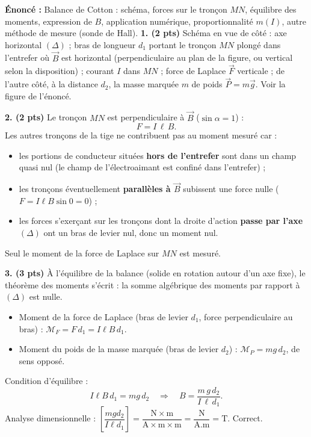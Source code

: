 \documentclass[11pt]{article}
\begin{document}
\begin{corrige}
\textbf{Énoncé :} Balance de Cotton : schéma, forces sur le tronçon $MN$, équilibre des moments, expression de $B$, application numérique, proportionnalité $m(I)$, autre méthode de mesure (sonde de Hall).
\tcblower
\textbf{1. (2 pts)} Schéma en vue de côté : axe horizontal $(\Delta)$ ; bras de longueur $d_1$ portant le tronçon $MN$ plongé dans l'entrefer où $\vec{B}$ est horizontal (perpendiculaire au plan de la figure, ou vertical selon la disposition) ; courant $I$ dans $MN$ ; force de Laplace $\vec{F}$ verticale ; de l'autre côté, à la distance $d_2$, la masse marquée $m$ de poids $\vec{P} = m\vec{g}$. Voir la figure de l'énoncé.

\textbf{2. (2 pts)} Le tronçon $MN$ est perpendiculaire à $\vec{B}$ ($\sin\alpha = 1$) :
\[ F = I\,\ell\,B. \]
Les autres tronçons de la tige ne contribuent pas au moment mesuré car :
\begin{itemize}
\item les portions de conducteur situées \textbf{hors de l'entrefer} sont dans un champ quasi nul (le champ de l'électroaimant est confiné dans l'entrefer) ;
\item les tronçons éventuellement \textbf{parallèles à $\vec{B}$} subissent une force nulle ($F = I\ell B\sin 0 = 0$) ;
\item les forces s'exerçant sur les tronçons dont la droite d'action \textbf{passe par l'axe $(\Delta)$} ont un bras de levier nul, donc un moment nul.
\end{itemize}
Seul le moment de la force de Laplace sur $MN$ est mesuré.

\textbf{3. (3 pts)} À l'équilibre de la balance (solide en rotation autour d'un axe fixe), le théorème des moments s'écrit : la somme algébrique des moments par rapport à $(\Delta)$ est nulle.
\begin{itemize}
\item Moment de la force de Laplace (bras de levier $d_1$, force perpendiculaire au bras) : $\mathcal{M}_F = F\,d_1 = I\ell B\,d_1$.
\item Moment du poids de la masse marquée (bras de levier $d_2$) : $\mathcal{M}_P = m g\,d_2$, de sens opposé.
\end{itemize}
Condition d'équilibre :
\[ I\ell B\,d_1 = m g\,d_2 \quad\Rightarrow\quad \boxed{B = \frac{m\,g\,d_2}{I\,\ell\,d_1}}. \]
Analyse dimensionnelle : $\left[\dfrac{mgd_2}{I\ell d_1}\right] = \dfrac{\mathrm{N\times m}}{\mathrm{A\times m\times m}} = \dfrac{\mathrm{N}}{\mathrm{A.m}} = \mathrm{T}$. Correct.


\end{corrige}
\end{document}
